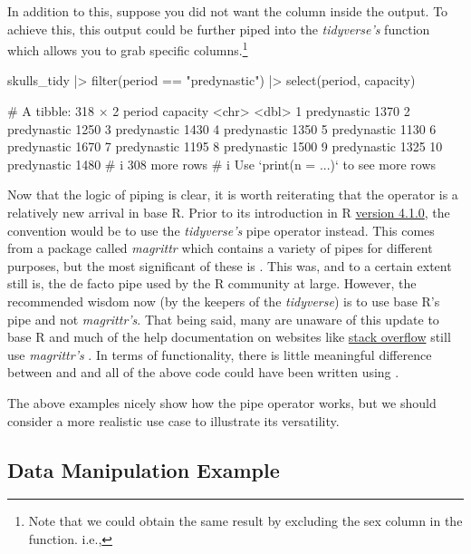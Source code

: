 In addition to this, suppose you did not want the  column inside the output. To achieve this, this output could be further piped into the \textit{tidyverse's}  function which allows you to grab specific columns.\footnote{Note that we could obtain the same result by excluding the sex column in the function. i.e., }

\begin{inR}
skulls_tidy |> 
  filter(period == "predynastic") |> 
  select(period, capacity)
\end{inR}
\begin{outR}
# A tibble: 318 × 2
   period      capacity
   <chr>          <dbl>
 1 predynastic     1370
 2 predynastic     1250
 3 predynastic     1430
 4 predynastic     1350
 5 predynastic     1130
 6 predynastic     1670
 7 predynastic     1195
 8 predynastic     1500
 9 predynastic     1325
10 predynastic     1480
# i 308 more rows
# i Use `print(n = ...)` to see more rows
\end{outR}

Now that the logic of piping is clear, it is worth reiterating that the \R{|>} operator is a relatively new arrival in base R. Prior to its introduction in R \href{https://stat.ethz.ch/pipermail/r-announce/2021/000670.html}{version 4.1.0}, the convention would be to use the \textit{tidyverse's} pipe operator \R{\%>\%} instead. This comes from a package called \textit{magrittr} which contains a variety of pipes for different purposes, but the most significant of these is \R{\%>\%}. This was, and to a certain extent still is, the de facto pipe used by the R community at large. However, the recommended wisdom now (by the keepers of the \textit{tidyverse}) is to use base R's pipe and not \textit{magrittr's}. That being said, many are unaware of this update to base R and much of the help documentation on websites like \href{https://stackoverflow.com/}{stack overflow} still use \textit{magrittr's} \R{\%>\%}. In terms of functionality, there is little meaningful difference between \R{|>} and \R{\%>\%} and all of the above code could have been written using \R{\%>\%}.

The above examples nicely show how the pipe operator works, but we should consider a more realistic use case to illustrate its versatility. 

\subsection{Data Manipulation Example}

